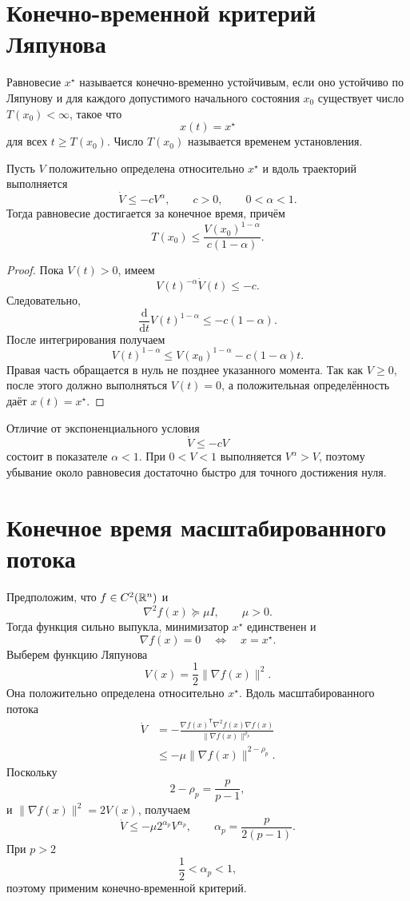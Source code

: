 \section{Конечно-временной критерий Ляпунова}

\begin{definition}
Равновесие \(x^\star\) называется конечно-временно устойчивым, если
оно устойчиво по Ляпунову и для каждого допустимого начального
состояния \(x_0\) существует число \(T(x_0)<\infty\), такое что
\[
    x(t)=x^\star
\]
для всех \(t\ge T(x_0)\). Число \(T(x_0)\) называется временем
установления.
\end{definition}

\begin{theorem}
Пусть \(V\) положительно определена относительно \(x^\star\) и вдоль
траекторий выполняется
\[
    \dot V\le-cV^\alpha,
    \qquad
    c>0,
    \qquad
    0<\alpha<1.
\]
Тогда равновесие достигается за конечное время, причём
\[
    T(x_0)
    \le
    \frac{V(x_0)^{1-\alpha}}
    {c(1-\alpha)}.
\]
\end{theorem}

\begin{proof}
Пока \(V(t)>0\), имеем
\[
    V(t)^{-\alpha}\dot V(t)\le-c.
\]
Следовательно,
\[
    \frac{\mathrm d}{\mathrm dt}V(t)^{1-\alpha}
    \le
    -c(1-\alpha).
\]
После интегрирования получаем
\[
    V(t)^{1-\alpha}
    \le
    V(x_0)^{1-\alpha}-c(1-\alpha)t.
\]
Правая часть обращается в нуль не позднее указанного момента. Так как
\(V\ge0\), после этого должно выполняться \(V(t)=0\), а положительная
определённость даёт \(x(t)=x^\star\).
\end{proof}

Отличие от экспоненциального условия
\[
    \dot V\le-cV
\]
состоит в показателе \(\alpha<1\). При \(0<V<1\) выполняется
\(V^\alpha>V\), поэтому убывание около равновесия достаточно быстро
для точного достижения нуля.

\section{Конечное время масштабированного потока}

Предположим, что \(f\in C^2(\mathbb{R}^n)\) и
\[
    \nabla^2f(x)\succeq\mu I,
    \qquad
    \mu>0.
\]
Тогда функция сильно выпукла, минимизатор \(x^\star\) единственен и
\[
    \nabla f(x)=0
    \quad\Longleftrightarrow\quad
    x=x^\star.
\]
Выберем функцию Ляпунова
\[
    V(x)=\frac12\lVert\nabla f(x)\rVert^2.
\]
Она положительно определена относительно \(x^\star\). Вдоль
масштабированного потока
\[
\begin{aligned}
    \dot V
    &=
    -\frac{
        \nabla f(x)^{\mathsf T}
        \nabla^2f(x)
        \nabla f(x)
    }{
        \lVert\nabla f(x)\rVert^{\rho_p}
    }
    \\
    &\le
    -\mu
    \lVert\nabla f(x)\rVert^{2-\rho_p}.
\end{aligned}
\]
Поскольку
\[
    2-\rho_p=\frac{p}{p-1},
\]
и \(\lVert\nabla f(x)\rVert^2=2V(x)\), получаем
\[
    \dot V
    \le
    -\mu2^{\alpha_p}V^{\alpha_p},
    \qquad
    \alpha_p=\frac{p}{2(p-1)}.
\]
При \(p>2\)
\[
    \frac12<\alpha_p<1,
\]
поэтому применим конечно-временной критерий.

